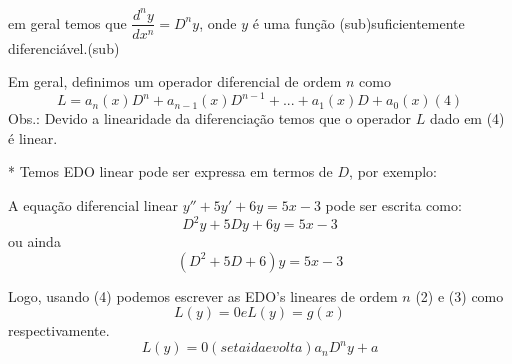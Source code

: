 \documentclass[
	article,			%
	11pt,				%
	oneside,			%
	a4paper,			%
	english,			%
	brazil,				%
	sumario=tradicional
	]{abntex2}
\begin{document}
em geral temos que $\dfrac{d^ny}{dx^n}=D^ny$, onde $y$ é uma função (sub)suficientemente diferenciável.(sub)

Em geral, definimos um operador diferencial de ordem $n$ como $$L = a_n(x)D^n+a_{n-1}(x)D^{n-1}+...+a_1(x)D+a_0(x) (4)$$ Obs.: Devido a linearidade da diferenciação temos que o operador $L$ dado em (4) é linear.

* Temos EDO linear pode ser expressa em termos de $D$, por exemplo:

A equação diferencial linear $y''+5y'+6y=5x-3$ pode ser escrita como: $$D^2y+5Dy+6y=5x-3$$ ou ainda $$(D^2+5D+6)y=5x-3$$

Logo, usando (4) podemos escrever as EDO's lineares de ordem $n$ (2) e (3) como $$L(y)=0 e L(y)=g(x)$$ respectivamente.
$$L(y)=0(seta ida e volta)a_nD^ny+a$$
\end{document}
